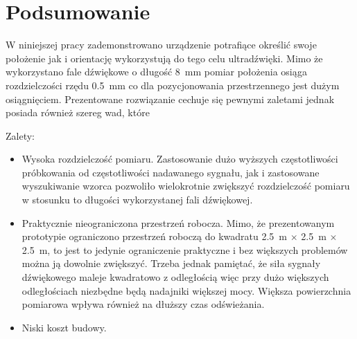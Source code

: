 \chapter{Podsumowanie}

W niniejszej pracy zademonstrowano urządzenie potrafiące określić swoje
położenie jak i orientację wykorzystują do tego celu ultradźwięki.
Mimo że wykorzystano fale dźwiękowe o długość \SI{8}{mm} pomiar położenia osiąga rozdzielczości rzędu \SI{0,5}{mm} co dla 
pozycjonowania przestrzennego jest dużym osiągnięciem.
Prezentowane rozwiązanie cechuje się pewnymi zaletami jednak posiada również szereg wad,
które 

Zalety:
\begin{itemize}
 \item Wysoka rozdzielczość pomiaru. Zastosowanie dużo wyższych częstotliwości 
 próbkowania od częstotliwości nadawanego sygnału, jak i zastosowane wyszukiwanie wzorca pozwoliło
 wielokrotnie zwiększyć rozdzielczość pomiaru w stosunku to długości wykorzystanej fali dźwiękowej.
 
 \item Praktycznie nieograniczona przestrzeń robocza. Mimo, że prezentowanym prototypie
 ograniczono przestrzeń roboczą do kwadratu \SI{2,5}{m} $\times$ \SI{2,5}{m} $\times$ \SI{2,5}{m},
 to jest to jedynie ograniczenie praktyczne i bez większych problemów można ją dowolnie zwiększyć. Trzeba jednak 
 pamiętać, że siła sygnały dźwiękowego maleje kwadratowo z odległością więc przy dużo większych odległościach
 niezbędne będą nadajniki większej mocy. Większa powierzchnia pomiarowa wpływa również na dłuższy czas odświeżania.

 \item Niski koszt budowy. 
\end{itemize}

